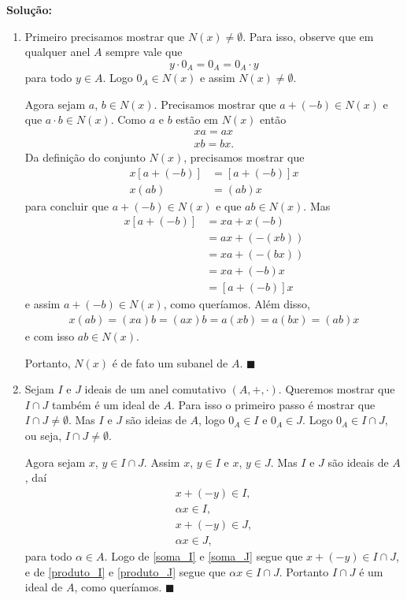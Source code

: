 \documentclass[12pt]{exam}
\renewcommand{\qedsymbol}{$\blacksquare$}
\begin{document}
    \noindent\textbf{Solu\c{c}\~ao:}
    \begin{enumerate}[label=({\arabic*})]
        \item Primeiro precisamos mostrar que $N(x) \ne \emptyset$. Para isso, observe que em qualquer anel $A$ sempre vale que
            \[ y \cdot 0_A = 0_A = 0_A\cdot y\]
        para todo $y \in A$. Logo $0_A \in N(x)$ e assim $N(x) \ne \emptyset$.

        Agora sejam $a$, $b \in N(x)$. Precisamos mostrar que $a + (-b)\in N(x)$ e que $a\cdot b \in N(x)$. Como $a$ e $b$ estão em $N(x)$
        então
        \begin{align}
            xa = ax\\
            xb = bx.
        \end{align}
        Da definição do conjunto $N(x)$, precisamos mostrar que
        \begin{align}
            x[a + (-b)] &= [a + (-b)]x\\
            x(ab) &= (ab)x
        \end{align}
        para concluir que $a + (-b) \in N(x)$ e que $ab \in N(x)$. Mas
        \begin{align*}
            x[a + (-b)] &= xa + x(-b) \\ &= ax + (-(xb)) \\ &= xa + (-(bx)) \\ &= xa + (-b)x \\ &= [a + (-b)]x
        \end{align*}
        e assim $a + (-b) \in N(x)$, como queríamos. Além disso,
        \begin{align*}
            x(ab) = (xa)b = (ax)b = a(xb) = a(bx) = (ab)x
        \end{align*}
        e com isso $ab \in N(x)$.

        Portanto, $N(x)$ é de fato um subanel de $A$. \hspace{.1cm} \qedsymbol
        \item Sejam $I$ e $J$ ideais de um anel comutativo $(A, +, \cdot)$. Queremos mostrar que $I \cap J$ também é um ideal de $A$. Para
            isso o primeiro passo é mostrar que $I \cap J \ne \emptyset$. Mas $I$ e $J$ são ideias de $A$, logo $0_A \in I$ e $0_A \in J$.
            Logo $0_A \in I \cap J$, ou seja, $I \cap J \ne \emptyset$.

            Agora sejam $x$, $y \in I \cap J$. Assim $x$, $y \in I$ e $x$, $y \in J$. Mas $I$ e $J$ são ideais de $A$, daí
            \begin{align}
                x + (-y) \in I,\label{soma_I}\\
                \alpha x \in I,\label{produto_I}\\
                x + (-y) \in J,\label{soma_J}\\
                \alpha x \in J\label{produto_J},
            \end{align}
            para todo $\alpha \in A$. Logo de \eqref{soma_I} e \eqref{soma_J} segue que $x + (-y) \in I \cap J$, e de \eqref{produto_I} e
            \eqref{produto_J} segue que $\alpha x \in I \cap J$. Portanto $I \cap J$ é um ideal de $A$, como queríamos. \hspace{.1cm} \qedsymbol
    \end{enumerate}
\end{document}
